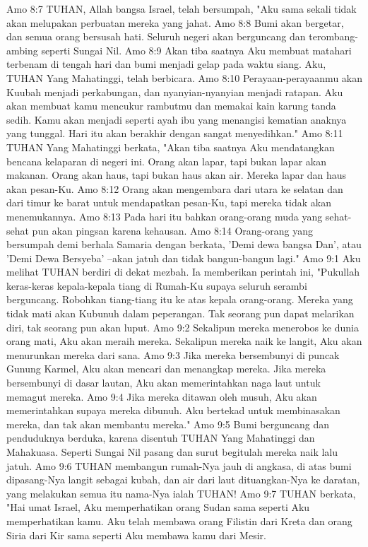 Amo 8:7  TUHAN, Allah bangsa Israel, telah bersumpah, "Aku sama sekali tidak akan melupakan perbuatan mereka yang jahat.
Amo 8:8  Bumi akan bergetar, dan semua orang bersusah hati. Seluruh negeri akan berguncang dan terombang-ambing seperti Sungai Nil.
Amo 8:9  Akan tiba saatnya Aku membuat matahari terbenam di tengah hari dan bumi menjadi gelap pada waktu siang. Aku, TUHAN Yang Mahatinggi, telah berbicara.
Amo 8:10  Perayaan-perayaanmu akan Kuubah menjadi perkabungan, dan nyanyian-nyanyian menjadi ratapan. Aku akan membuat kamu mencukur rambutmu dan memakai kain karung tanda sedih. Kamu akan menjadi seperti ayah ibu yang menangisi kematian anaknya yang tunggal. Hari itu akan berakhir dengan sangat menyedihkan."
Amo 8:11  TUHAN Yang Mahatinggi berkata, "Akan tiba saatnya Aku mendatangkan bencana kelaparan di negeri ini. Orang akan lapar, tapi bukan lapar akan makanan. Orang akan haus, tapi bukan haus akan air. Mereka lapar dan haus akan pesan-Ku.
Amo 8:12  Orang akan mengembara dari utara ke selatan dan dari timur ke barat untuk mendapatkan pesan-Ku, tapi mereka tidak akan menemukannya.
Amo 8:13  Pada hari itu bahkan orang-orang muda yang sehat-sehat pun akan pingsan karena kehausan.
Amo 8:14  Orang-orang yang bersumpah demi berhala Samaria dengan berkata, 'Demi dewa bangsa Dan', atau 'Demi Dewa Bersyeba' --akan jatuh dan tidak bangun-bangun lagi."
Amo 9:1  Aku melihat TUHAN berdiri di dekat mezbah. Ia memberikan perintah ini, "Pukullah keras-keras kepala-kepala tiang di Rumah-Ku supaya seluruh serambi berguncang. Robohkan tiang-tiang itu ke atas kepala orang-orang. Mereka yang tidak mati akan Kubunuh dalam peperangan. Tak seorang pun dapat melarikan diri, tak seorang pun akan luput.
Amo 9:2  Sekalipun mereka menerobos ke dunia orang mati, Aku akan meraih mereka. Sekalipun mereka naik ke langit, Aku akan menurunkan mereka dari sana.
Amo 9:3  Jika mereka bersembunyi di puncak Gunung Karmel, Aku akan mencari dan menangkap mereka. Jika mereka bersembunyi di dasar lautan, Aku akan memerintahkan naga laut untuk memagut mereka.
Amo 9:4  Jika mereka ditawan oleh musuh, Aku akan memerintahkan supaya mereka dibunuh. Aku bertekad untuk membinasakan mereka, dan tak akan membantu mereka."
Amo 9:5  Bumi berguncang dan penduduknya berduka, karena disentuh TUHAN Yang Mahatinggi dan Mahakuasa. Seperti Sungai Nil pasang dan surut begitulah mereka naik lalu jatuh.
Amo 9:6  TUHAN membangun rumah-Nya jauh di angkasa, di atas bumi dipasang-Nya langit sebagai kubah, dan air dari laut dituangkan-Nya ke daratan, yang melakukan semua itu nama-Nya ialah TUHAN!
Amo 9:7  TUHAN berkata, "Hai umat Israel, Aku memperhatikan orang Sudan sama seperti Aku memperhatikan kamu. Aku telah membawa orang Filistin dari Kreta dan orang Siria dari Kir sama seperti Aku membawa kamu dari Mesir.
